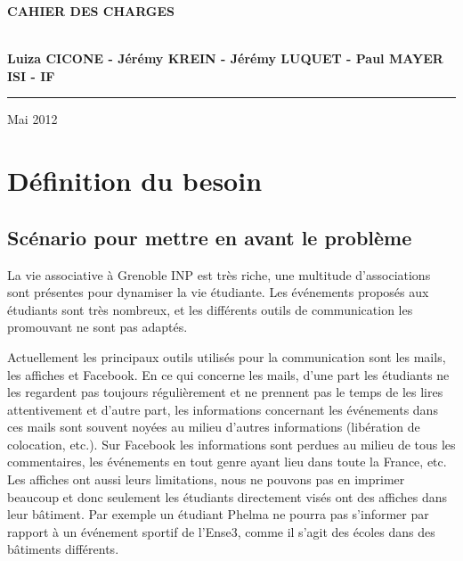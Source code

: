\documentclass[a4paper, 11px]{article}
\begin{document}
\begin{titlepage}
\begin{center}
\begin{center}
{\Huge \bf CAHIER DES CHARGES}


\end{center}


\vspace{1cm}

\begin{center}
$ $\\
\large{ \textbf{Luiza CICONE - Jérémy KREIN - Jérémy LUQUET - Paul MAYER}}\\
\large{ \textbf{ISI - IF}}
$ $\\
\end{center}
\rule{\linewidth}{.5pt}


\vfill


{\large Mai 2012}

\end{center}
\end{titlepage}

\tableofcontents

\newpage


\section{Définition du besoin}

\subsection{Scénario pour mettre en avant le problème}

La vie associative à Grenoble INP est très riche, une multitude d'associations sont présentes pour dynamiser la vie étudiante.
Les événements proposés aux étudiants sont très nombreux, et les différents outils de communication les promouvant ne sont pas adaptés.

Actuellement les principaux outils utilisés pour la communication sont les mails, les affiches et Facebook.
En ce qui concerne les mails, d'une part les étudiants ne les regardent pas toujours régulièrement et ne prennent pas le temps de les lires attentivement et
d'autre part, les informations concernant les événements dans ces mails sont souvent noyées au milieu d'autres informations (libération de colocation, etc.).
Sur Facebook les informations sont perdues au milieu de tous les commentaires, les événements en tout genre ayant lieu dans toute
la France, etc.
Les affiches ont aussi leurs limitations, nous ne pouvons pas en imprimer beaucoup et donc seulement les étudiants directement visés ont des affiches dans leur bâtiment. 
Par exemple un étudiant Phelma ne pourra pas s'informer par rapport à un événement sportif de l'Ense3, comme il s'agit des écoles dans des bâtiments différents.
\end{document}
